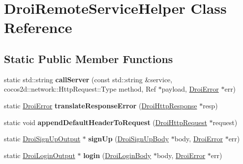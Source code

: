 \hypertarget{class_droi_remote_service_helper}{}\section{Droi\+Remote\+Service\+Helper Class Reference}
\label{class_droi_remote_service_helper}
\subsection*{Static Public Member Functions}
\begin{DoxyCompactItemize}
\item 
\mbox{\label{class_droi_remote_service_helper_a718e5c53c0b2a4a6cadb689b9d03e3e9}} 
static std\+::string {\bfseries call\+Server} (const std\+::string \&service, cocos2d\+::network\+::\+Http\+Request\+::\+Type method, Ref $\ast$payload, \hyperlink{class_droi_error}{Droi\+Error} $\ast$err)
\item 
\mbox{\label{class_droi_remote_service_helper_a7947358ab471aa54398a2ef20fec84b2}} 
static \hyperlink{class_droi_error}{Droi\+Error} {\bfseries translate\+Response\+Error} (\hyperlink{class_droi_http_response}{Droi\+Http\+Response} $\ast$resp)
\item 
\mbox{\label{class_droi_remote_service_helper_ab3644ba706ef9bed0f0c8f6ba22b37e9}} 
static void {\bfseries append\+Default\+Header\+To\+Request} (\hyperlink{class_droi_http_request}{Droi\+Http\+Request} $\ast$request)
\item 
\mbox{\label{class_droi_remote_service_helper_a5806b86d70076ea080cb6ee5f9658272}} 
static \hyperlink{class_droi_sign_up_output}{Droi\+Sign\+Up\+Output} $\ast$ {\bfseries sign\+Up} (\hyperlink{class_droi_sign_up_body}{Droi\+Sign\+Up\+Body} $\ast$body, \hyperlink{class_droi_error}{Droi\+Error} $\ast$err)
\item 
\mbox{\label{class_droi_remote_service_helper_a6eb3dcbf4ba74b94eeb3b75058cd7179}} 
static \hyperlink{class_droi_login_output}{Droi\+Login\+Output} $\ast$ {\bfseries login} (\hyperlink{class_droi_login_body}{Droi\+Login\+Body} $\ast$body, \hyperlink{class_droi_error}{Droi\+Error} $\ast$err)

\end{DoxyCompactItemize}
